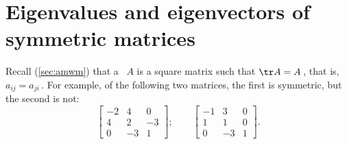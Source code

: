
\chapter{Eigenvalues and eigenvectors of symmetric matrices}
\label{ch:eesm}

\minitoc


Recall (\cref{sec:amwm}) that a ~\(A\) is a square matrix such that \(\tr A=A\)\,, that is, \(a_{ij}=a_{ji}\)\,.
For example, of the following two matrices, the first is symmetric, but the second is not:
\begin{equation*}
\begin{bmatrix} -2&4&0
\\4&2&-3
\\0&-3&1 \end{bmatrix};\qquad
\begin{bmatrix} -1&3&0
\\1&1&0
\\0&-3&1 \end{bmatrix}.
\end{equation*}

